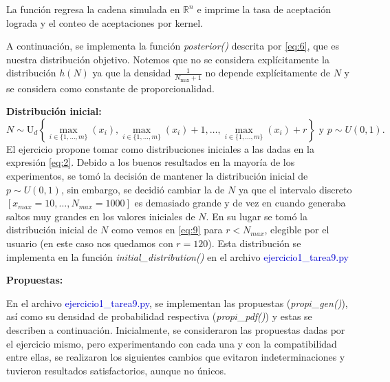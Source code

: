 La función regresa la cadena simulada en $\mathbb{R}^n$ e imprime la tasa de aceptación lograda y el conteo de aceptaciones por kernel.

A continuación, se implementa la función \textit{posterior()} descrita por \eqref{eq:6}, que es nuestra distribución objetivo. Notemos que no se considera explícitamente la distribución $h(N)$ ya que la densidad $\frac{1}{N_{\max} + 1}$ no depende explícitamente de $N$ y se considera como constante de proporcionalidad.

\textbf{Distribución inicial:}
\begin{equation}\label{eq:9}
	N \sim \mathrm{U}_{d}\left\{\max _{i \in\{1, \ldots, m\}}\left(x_{i}\right), \max _{i \in\{1, \ldots, m\}}\left(x_{i}\right)+1, \ldots, \max _{i \in\{1, \ldots, m\}}\left(x_{i}\right) + r\right\} \text{ y } p\sim U(0,1).
\end{equation}
El ejercicio propone tomar como distribuciones iniciales a las dadas en la expresión \eqref{eq:2}. Debido a los buenos resultados en la mayoría de los experimentos, se tomó la decisión de mantener la distribución inicial de $p\sim U(0,1)$, sin embargo, se decidió cambiar la de $N$ ya que el intervalo discreto $[x_{max} = 10,\dots, N_{max} = 1000]$ es demasiado grande y de vez en cuando generaba saltos muy grandes en los valores iniciales de $N$. En su lugar se tomó la distribución inicial de $N$ como vemos en \eqref{eq:9} para $r<N_{max}$, elegible por el usuario (en este caso nos quedamos con $r=120$). Esta distribución se implementa en la función \textit{initial\_distribution()} en el archivo \textcolor{mediumblue}{ejercicio1\_tarea9.py}

\textbf{Propuestas:}

En el archivo \textcolor{mediumblue}{ejercicio1\_tarea9.py}, se implementan las propuestas (\textit{prop$i$\_gen()}), así como su densidad de probabilidad respectiva (\textit{prop$i$\_pdf()}) y estas se describen a continuación. Inicialmente, se consideraron las propuestas dadas por el ejercicio mismo, pero experimentando con cada una y con la compatibilidad entre ellas, se realizaron los siguientes cambios que evitaron indeterminaciones y tuvieron resultados satisfactorios, aunque no únicos.

